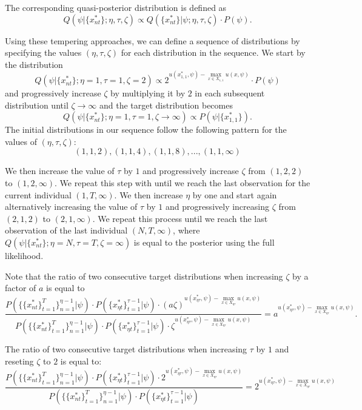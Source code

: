 \documentclass[12pt]{article}
\begin{document}
The corresponding quasi-posterior distribution is defined as
$$ Q(\psi|\{x_{nt}^*\};\eta,\tau,\zeta) \propto Q(\{x_{nt}^*\}|\psi;\eta,\tau,\zeta) \cdot P(\psi) .$$

Using these tempering approaches, we can define a sequence of distributions by specifying the values $(\eta,\tau,\zeta)$ for each distribution in the sequence. We start by the distribution 
$$Q(\psi|\{x_{nt}^*\};\eta=1,\tau=1,\zeta=2) \propto 2^{ u(x_{1,1}^*,\psi) - \max_{x \in X_{1,1}} u(x,\psi)} \cdot P(\psi)$$ 
and progressively increase $\zeta$ by multiplying it by $2$ in each subsequent distribution until $\zeta \to \infty$ and the target distribution becomes
$$ Q(\psi|\{x_{nt}^*\};\eta=1,\tau=1,\zeta \to \infty) \propto  P(\psi|\{x_{1,1}^*\}).$$
The initial distributions in our sequence follow the following pattern for the values of $(\eta,\tau,\zeta)$:
$$(1,1,2),(1,1,4),(1,1,8),...,(1,1,\infty) $$

We then increase the value of $\tau$ by $1$ and progressively increase $\zeta$ from $(1,2,2)$ to $(1,2,\infty)$. We repeat this step with until we reach the last observation for the current individual $(1,T,\infty)$. We then increase $\eta$ by one and start again alternatively increasing the value of $\tau$ by $1$ and progressively increasing $\zeta$ from $(2,1,2)$ to $(2,1,\infty)$. We repeat this process until we reach the last observation of the last individual $(N,T,\infty)$, where $Q(\psi|\{x_{nt}^*\};\eta=N,\tau=T,\zeta=\infty)$ is equal to the posterior using the full likelihood.

Note that the ratio of two consecutive target distributions when increasing $\zeta$ by a factor of $a$ is equal to
$$ \frac{P(\{\{x_{nt}^*\}_{t=1}^T\}_{n=1}^{\eta-1}|\psi) \cdot  P(\{x_{\eta t}^*\}_{t=1}^{\tau-1}|\psi) \cdot (a \zeta)^{ u(x_{\eta \tau}^*,\psi) - \max_{x \in X_{\eta \tau}} u(x,\psi)}}{P(\{\{x_{nt}^*\}_{t=1}^T\}_{n=1}^{\eta-1}|\psi) \cdot  P(\{x_{\eta t}^*\}_{t=1}^{\tau-1}|\psi) \cdot \zeta^{ u(x_{\eta \tau}^*,\psi) - \max_{x \in X_{\eta \tau}} u(x,\psi)}} = a^{ u(x_{\eta \tau}^*,\psi) - \max_{x \in X_{\eta \tau}} u(x,\psi)}.$$

The ratio of two consecutive target distributions when increasing $\tau$ by $1$ and reseting $\zeta$ to $2$ is equal to:
$$ \frac{  P(\{\{x_{nt}^*\}_{t=1}^T\}_{n=1}^{\eta-1}|\psi) \cdot  P(\{x_{\eta t}^*\}_{t=1}^{\tau-1}|\psi) \cdot 2^{ u(x_{\eta \tau}^*,\psi) - \max_{x \in X_{\eta \tau}} u(x,\psi)}}{P(\{\{x_{nt}^*\}_{t=1}^T\}_{n=1}^{\eta-1}|\psi) \cdot  P(\{x_{\eta t}^*\}_{t=1}^{\tau-1}|\psi)} = 2^{ u(x_{\eta \tau}^*,\psi) - \max_{x \in X_{\eta \tau}} u(x,\psi)} $$
\end{document}
